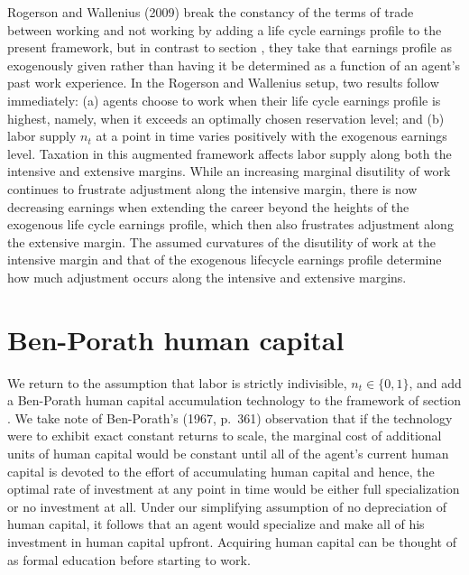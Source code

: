 Rogerson and Wallenius (2009) break the constancy of the terms
of trade between working and not working by adding a life cycle
earnings profile to the present framework, but in contrast to section
, they  take that earnings profile as exogenously given
rather than having it be determined as a function of an agent's past work experience. In the
Rogerson and Wallenius setup, two results
follow immediately: (a) agents choose to work when their life cycle
earnings profile is highest, namely, when it  exceeds an
optimally chosen reservation level; and (b)
labor supply $n_t$ at a point in time varies positively with the
exogenous earnings level. Taxation in this augmented
framework affects labor supply along both the intensive and extensive
margins. While an increasing marginal disutility of work continues
to frustrate adjustment along the intensive margin, there is now
decreasing earnings when extending the career beyond the heights of the exogenous life cycle earnings profile, which
then also frustrates adjustment along the extensive margin. The
assumed curvatures of the disutility of work at the intensive
margin and that of the exogenous lifecycle earnings
profile determine how much  adjustment occurs
along the intensive and extensive margins.



\section{Ben-Porath human capital}\label{sec:LSbenporath}%
We return to the assumption that labor is strictly indivisible,
$n_t\in \{0,1\}$, and add a Ben-Porath human capital accumulation
technology to the framework of section . We take
note of Ben-Porath's (1967, p.~361) observation that if the
technology were to exhibit exact constant returns to scale, the
marginal cost of additional units of human capital would be
constant until all of the agent's current human capital
is devoted to the effort of accumulating human capital and hence,
the optimal rate of investment at any point in time would be
either full specialization or no investment at all. Under our
simplifying assumption of no depreciation of human capital,
it follows that an agent would specialize and make all of
his investment in human capital upfront. Acquiring human capital  can be
thought of as formal education before starting to work.
%

